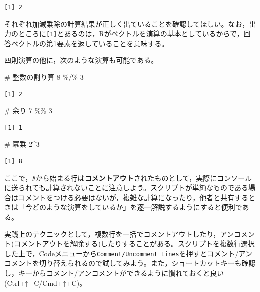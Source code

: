 \documentclass[
  a4paper,
]{ltjsbook}
\newenvironment{Shaded}{\begin{snugshade}}{\end{snugshade}}
\newcommand{\CommentTok}[1]{\textcolor[rgb]{0.37,0.37,0.37}{#1}}
\newcommand{\DecValTok}[1]{\textcolor[rgb]{0.68,0.00,0.00}{#1}}
\newcommand{\SpecialCharTok}[1]{\textcolor[rgb]{0.37,0.37,0.37}{#1}}
\begin{document}
\begin{verbatim}
[1] 2
\end{verbatim}

それぞれ加減乗除の計算結果が正しく出ていることを確認してほしい。なお，出力のところに\texttt{{[}1{]}}とあるのは，Rがベクトルを演算の基本としているからで，回答ベクトルの第1要素を返していることを意味する。

四則演算の他に，次のような演算も可能である。

\begin{Shaded}
\begin{Highlighting}[]
\CommentTok{\# 整数の割り算}
\DecValTok{8} \SpecialCharTok{\%/\%} \DecValTok{3}
\end{Highlighting}
\end{Shaded}

\begin{verbatim}
[1] 2
\end{verbatim}

\begin{Shaded}
\begin{Highlighting}[]
\CommentTok{\# 余り}
\DecValTok{7} \SpecialCharTok{\%\%} \DecValTok{3}
\end{Highlighting}
\end{Shaded}

\begin{verbatim}
[1] 1
\end{verbatim}

\begin{Shaded}
\begin{Highlighting}[]
\CommentTok{\# 冪乗}
\DecValTok{2}\SpecialCharTok{\^{}}\DecValTok{3}
\end{Highlighting}
\end{Shaded}

\begin{verbatim}
[1] 8
\end{verbatim}

ここで，\texttt{\#}から始まる行は\textbf{コメントアウト}されたものとして，実際にコンソールに送られても計算されないことに注意しよう。スクリプトが単純なものである場合はコメントをつける必要はないが，複雑な計算になったり，他者と共有するときは「今どのような演算をしているか」を逐一解説するようにすると便利である。

実践上のテクニックとして，複数行を一括でコメントアウトしたり，アンコメント(コメントアウトを解除する)したりすることがある。スクリプトを複数行選択した上で，Codeメニューから\texttt{Comment/Uncomment\ Lines}を押すとコメント/アンコメントを切り替えられるので試してみよう。また，ショートカットキーも確認し，キーからコメント/アンコメントができるように慣れておくと良い(Ctrl+↑+C/Cmd+↑+C)。
\end{document}
